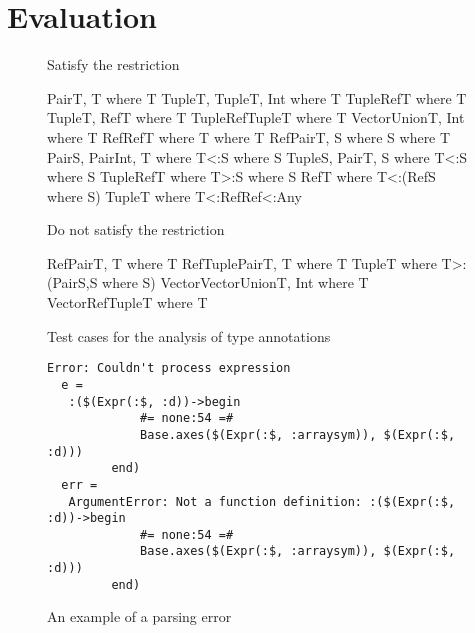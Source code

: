 \clearpage
\section{Evaluation}\label{sec:app:eval}

\begin{figure}
\small
\begin{minipage}{6.5cm}
    \centering
    Satisfy the restriction
\begin{julia}
Pair{T, T} where T
Tuple{T, Tuple{T, Int}} where T
Tuple{Ref{T}} where T
Tuple{T, Ref{T}} where T
Tuple{Ref{Tuple{T}}} where T
Vector{Union{T, Int}} where T
Ref{Ref{T} where T} where T
Ref{Pair{T, S} where S} where T
Pair{S, Pair{Int, T} where T<:S} where S
Tuple{S, Pair{T, S} where T<:S} where S
Tuple{Ref{T} where T>:S} where S
Ref{T} where T<:(Ref{S} where S)
Tuple{T} where T<:Ref{Ref{<:Any}}
\end{julia}
\end{minipage}
\hspace{1cm}
\begin{minipage}{6cm}
    \centering
    Do not satisfy the restriction
\begin{julia}
Ref{Pair{T, T} where T}
Ref{Tuple{Pair{T, T} where T}}
Tuple{T} where T>:(Pair{S,S} where S)
Vector{Vector{Union{T, Int}} where T}
Vector{Ref{Tuple{T}} where T}
\end{julia}
\end{minipage}
\caption{Test cases for the analysis of type annotations
}\label{fig:tests:ta-analysis}
\end{figure}

\begin{figure}
\begin{lstlisting}
Error: Couldn't process expression
  e =
   :($(Expr(:$, :d))->begin
             #= none:54 =#
             Base.axes($(Expr(:$, :arraysym)), $(Expr(:$, :d)))
         end)
  err =
   ArgumentError: Not a function definition: :($(Expr(:$, :d))->begin
             #= none:54 =#
             Base.axes($(Expr(:$, :arraysym)), $(Expr(:$, :d)))
         end)
\end{lstlisting}
\caption{An example of a parsing error}\label{fig:evaluation-parse-errors}
\end{figure}

